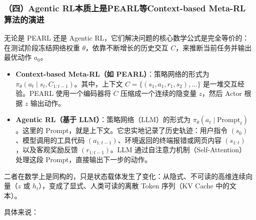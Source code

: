 \hypertarget{ux56dbagentic-rlux672cux8d28ux4e0aux662fpearlux7b49context-based-meta-rlux7b97ux6cd5ux7684ux6f14ux8fdb}{%
\subsubsection{（四）Agentic RL本质上是PEARL等Context-based Meta-RL算法的演进}\label{ux56dbagentic-rlux672cux8d28ux4e0aux662fpearlux7b49context-based-meta-rlux7b97ux6cd5ux7684ux6f14ux8fdb}}

无论是 PEARL 还是 Agentic RL，它们解决问题的核心数学公式是完全等价的：在测试阶段冻结网络权重 \(\theta\)，依靠不断增长的历史交互 \(C\)，来推断当前任务并输出最优动作 \(a_0\)。

\begin{itemize}
\tightlist
\item
  \textbf{Context-based Meta-RL（如 PEARL）}：策略网络的形式为 \(\pi_{\theta}(a_t\mid s_t,C_{1:t-1})\)。其中，上下文 \(C=\{(s_1,a_1,r_1,s_2),\ldots\}\) 是一堆交互经验。PEARL 使用一个编码器将 \(C\) 压缩成一个连续的隐变量 \(z\)，然后 Actor 根据 \(z\) 输出动作。
\item
  \textbf{Agentic RL（基于 LLM）}：策略网络（LLM）的形式为 \(\pi_{\theta}(a_t\mid\mathrm{Prompt}_t)\)。这里的 Prompt，就是上下文。它忠实地记录了历史轨迹：用户指令 \((s_0)\)、模型调用的工具代码 \((a_{1:t-1})\)、环境返回的终端报错或网页内容 \((s_{1:t})\)，以及客观奖励反馈 \((r_{1:t-1})\)。LLM 通过自注意力机制（Self-Attention）处理这段 Prompt，直接输出下一步的动作。
\end{itemize}

二者在数学上是同构的，只是状态载体发生了变化：从隐式、不可读的高维连续向量（\(z\) 或 \(h_t\)），变成了显式、人类可读的离散 Token 序列（KV Cache 中的文本）。

具体来说：


